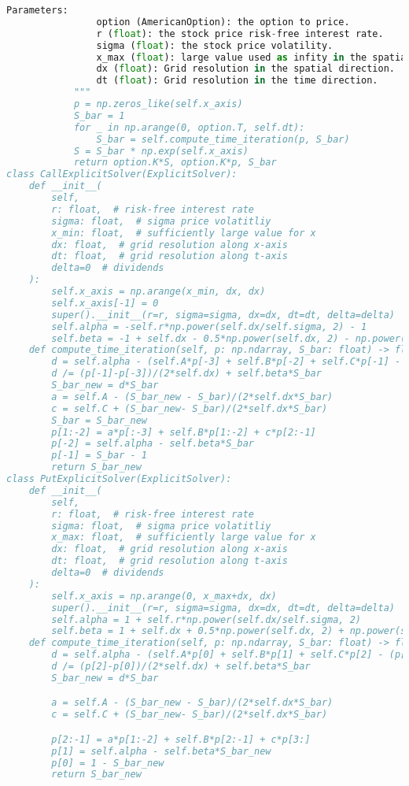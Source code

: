 \begin{lstlisting}[language=Python, caption=Explicit solver for Company transformation.]
            Parameters:
                option (AmericanOption): the option to price.
                r (float): the stock price risk-free interest rate.
                sigma (float): the stock price volatility.
                x_max (float): large value used as infity in the spatial.
                dx (float): Grid resolution in the spatial direction.
                dt (float): Grid resolution in the time direction.
            """
            p = np.zeros_like(self.x_axis)
            S_bar = 1
            for _ in np.arange(0, option.T, self.dt):
                S_bar = self.compute_time_iteration(p, S_bar)
            S = S_bar * np.exp(self.x_axis)
            return option.K*S, option.K*p, S_bar
class CallExplicitSolver(ExplicitSolver):
    def __init__(
        self,
        r: float,  # risk-free interest rate
        sigma: float,  # sigma price volatitliy
        x_min: float,  # sufficiently large value for x
        dx: float,  # grid resolution along x-axis
        dt: float,  # grid resolution along t-axis
        delta=0  # dividends
    ):                 
        self.x_axis = np.arange(x_min, dx, dx)
        self.x_axis[-1] = 0
        super().__init__(r=r, sigma=sigma, dx=dx, dt=dt, delta=delta)
        self.alpha = -self.r*np.power(self.dx/self.sigma, 2) - 1
        self.beta = -1 + self.dx - 0.5*np.power(self.dx, 2) - np.power(self.dx/self.sigma, 2)*self.delta 
    def compute_time_iteration(self, p: np.ndarray, S_bar: float) -> float:
        d = self.alpha - (self.A*p[-3] + self.B*p[-2] + self.C*p[-1] - (p[-1]-p[-3])/(2*self.dx))
        d /= (p[-1]-p[-3])/(2*self.dx) + self.beta*S_bar
        S_bar_new = d*S_bar
        a = self.A - (S_bar_new - S_bar)/(2*self.dx*S_bar)
        c = self.C + (S_bar_new- S_bar)/(2*self.dx*S_bar)
        S_bar = S_bar_new
        p[1:-2] = a*p[:-3] + self.B*p[1:-2] + c*p[2:-1]
        p[-2] = self.alpha - self.beta*S_bar 
        p[-1] = S_bar - 1
        return S_bar_new
class PutExplicitSolver(ExplicitSolver):
    def __init__(
        self,
        r: float,  # risk-free interest rate
        sigma: float,  # sigma price volatitliy
        x_max: float,  # sufficiently large value for x
        dx: float,  # grid resolution along x-axis
        dt: float,  # grid resolution along t-axis
        delta=0  # dividends
    ):                 
        self.x_axis = np.arange(0, x_max+dx, dx)
        super().__init__(r=r, sigma=sigma, dx=dx, dt=dt, delta=delta)
        self.alpha = 1 + self.r*np.power(self.dx/self.sigma, 2)
        self.beta = 1 + self.dx + 0.5*np.power(self.dx, 2) + np.power(self.dx/self.sigma, 2)*self.delta 
    def compute_time_iteration(self, p: np.ndarray, S_bar: float) -> float:
        d = self.alpha - (self.A*p[0] + self.B*p[1] + self.C*p[2] - (p[2]-p[0])/(2*self.dx))
        d /= (p[2]-p[0])/(2*self.dx) + self.beta*S_bar
        S_bar_new = d*S_bar

        a = self.A - (S_bar_new - S_bar)/(2*self.dx*S_bar)
        c = self.C + (S_bar_new- S_bar)/(2*self.dx*S_bar)

        p[2:-1] = a*p[1:-2] + self.B*p[2:-1] + c*p[3:]
        p[1] = self.alpha - self.beta*S_bar_new
        p[0] = 1 - S_bar_new
        return S_bar_new    
\end{lstlisting}
